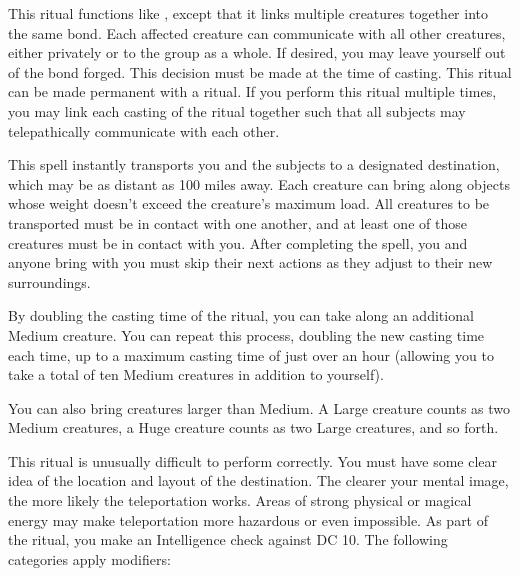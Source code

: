 \spelleffect This ritual functions like , except that it links multiple creatures together into the same bond. Each affected creature can communicate with all other creatures, either privately or to the group as a whole. If desired, you may leave yourself out of the bond forged. This decision must be made at the time of casting.
\spellnotes This ritual can be made permanent with a  ritual. If you perform this ritual multiple times, you may link each casting of the ritual together such that all subjects may telepathically communicate with each other. 

\spelleffect This spell instantly transports you and the subjects to a designated destination, which may be as distant as 100 miles away. Each creature can bring along objects whose weight doesn't exceed the creature's maximum load. All creatures to be transported must be in contact with one another, and at least one of those creatures must be in contact with you. After completing the spell, you and anyone bring with you must skip their next actions as they adjust to their new surroundings.
\par By doubling the casting time of the ritual, you can take along an additional Medium creature. You can repeat this process, doubling the new casting time each time, up to a maximum casting time of just over an hour (allowing you to take a total of ten Medium creatures in addition to yourself).
\par You can also bring creatures larger than Medium. A Large creature counts as two Medium creatures, a Huge creature counts as two Large creatures, and so forth.
\par This ritual is unusually difficult to perform correctly. You must have some clear idea of the location and layout of the destination. The clearer your mental image, the more likely the teleportation works. Areas of strong physical or magical energy may make teleportation more hazardous or even impossible. As part of the ritual, you make an Intelligence check against DC 10. The following categories apply modifiers:
